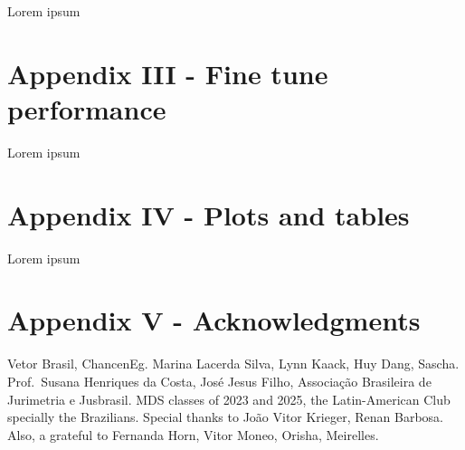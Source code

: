 \documentclass[
  12pt,
]{article}
\begin{document}
Lorem ipsum

\section{Appendix III - Fine tune
performance}\label{appendix-iii---fine-tune-performance}

Lorem ipsum

\section{Appendix IV - Plots and
tables}\label{appendix-iv---plots-and-tables}

Lorem ipsum

\section{Appendix V -
Acknowledgments}\label{appendix-v---acknowledgments}

Vetor Brasil, ChancenEg. Marina Lacerda Silva, Lynn Kaack, Huy Dang,
Sascha. Prof.~Susana Henriques da Costa, José Jesus Filho, Associação
Brasileira de Jurimetria e Jusbrasil. MDS classes of 2023 and 2025, the
Latin-American Club specially the Brazilians. Special thanks to João
Vitor Krieger, Renan Barbosa. Also, a grateful to Fernanda Horn, Vitor
Moneo, Orisha, Meirelles.
\end{document}

